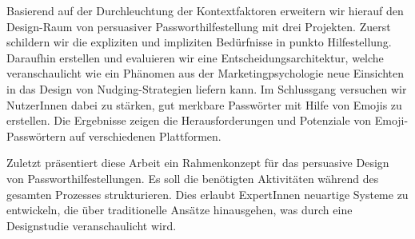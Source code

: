 Basierend auf der Durchleuchtung der Kontextfaktoren erweitern wir hierauf den Design-Raum von persuasiver Passworthilfestellung mit drei Projekten. Zuerst schildern wir die expliziten und impliziten Bedürfnisse in punkto Hilfestellung. Daraufhin erstellen und evaluieren wir eine Entscheidungsarchitektur, welche veranschaulicht wie ein Phänomen aus der Marketingpsychologie neue Einsichten in das Design von Nudging-Strategien liefern kann. Im Schlussgang versuchen wir NutzerInnen dabei zu stärken, gut merkbare Passwörter mit Hilfe von Emojis zu erstellen. Die Ergebnisse zeigen die Herausforderungen und Potenziale von Emoji-Passwörtern auf verschiedenen Plattformen. 

Zuletzt präsentiert diese Arbeit ein Rahmenkonzept für das persuasive Design von Passworthilfestellungen. Es soll die benötigten Aktivitäten während des gesamten Prozesses strukturieren. Dies erlaubt ExpertInnen neuartige Systeme zu entwickeln, die über traditionelle Ansätze hinausgehen, was durch eine Designstudie veranschaulicht wird. 
